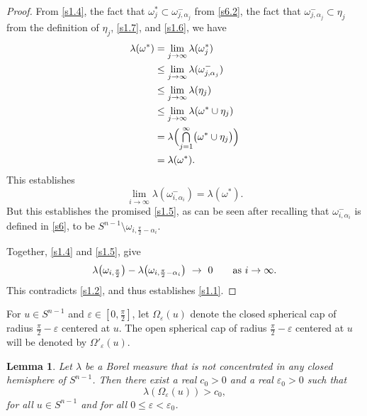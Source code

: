 \documentclass{cpamart1}     %
\newtheorem{lemm}[theo]{Lemma}
\theoremstyle{definition}
\theoremstyle{remark}
\newcommand*{\medcap}{\mathsmaller{\bigcap}}%
\newcommand{\sn}{S^{n-1}}
\begin{document}
\begin{proof}
From \eqref{s1.4}, the fact that $\omega_j^* \subset \omega_{j,\alpha_j}^-$
from \eqref{s6.2}, the fact that $\omega_{j,\alpha_j}^- \subset \eta_j$
from the definition of $\eta_j$,
\eqref{s1.7}, and \eqref{s1.6}, we have
\begin{align*}
\lambda(\omega^*) &= \lim_{j\to \infty} \lambda(\omega_j^*) \\
&\le \lim_{j\to \infty} \lambda(\omega_{j,\alpha_j}^-) \\
&\le \lim_{j\to \infty} \lambda(\eta_j) \\
&\le \lim_{j\to \infty} \lambda(\omega^* \cup \eta_j) \\
&=\lambda \Big(\medcap\limits_{j=1}^\infty\big(\omega^* \cup \eta_j\big) \Big) \\
&= \lambda(\omega^*).
\end{align*}
This establishes
\[
\lim_{i\to\infty} \lambda(\omega^-_{i, \alpha_i})= \lambda(\omega^*).
\]
But this establishes the promised \eqref{s1.5}, as can be seen after recalling that
 $\omega_{i,\alpha_i}^-$ is defined in \eqref{s6}, to be
$\sn \setminus \omega_{i,\frac\pi2-\alpha_i}$.



Together, \eqref{s1.4} and \eqref{s1.5},
give
\begin{equation*}
\text{$\lambda\big(\omega_{i,\frac\pi2}\big) -
\lambda\big(\omega_{i,\frac\pi2 - \alpha_i}\big)\  \to\  0$\qquad as\ $i\to \infty$.}
\end{equation*}
This contradicts \eqref{s1.2}, and thus establishes \eqref{s1.1}.
\end{proof}





For $u\in\sn$ and $\varepsilon \in [0,\frac\pi2]$, let $\Omega_\varepsilon(u)$
denote the closed spherical cap of radius
$\frac\pi2 - \varepsilon$ centered at $u$. The open spherical cap of radius
$\frac\pi2 - \varepsilon$ centered at $u$ will be
denoted by $\Omega'_\varepsilon(u)$.



\begin{lemm}\label{s2}
Let $\lambda$ be a Borel measure that is not concentrated in any closed hemisphere of $\sn$.
Then there exist a real $c_0>0$ and a real $\varepsilon_0 > 0$ such that
\begin{equation*}
\lambda(\Omega_{\varepsilon}(u)) > c_0,
\end{equation*}
for all $u\in\sn$ and for all $0\leq \varepsilon<\varepsilon_0$.
\end{lemm}
\end{document}
